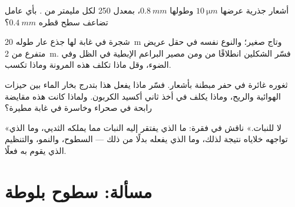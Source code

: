 \begin{exercise}[$\star\star$]\label{exo:b1:flowering-plant-organization:9}
أشعار جذرية عرضها $\qty{10}{\micro m}$ وطولها $\qty{0.8}{mm}$،
بمعدل \qty{250}{} لكل مليمتر من . بأي عامل تضاعف سطح  قطره
$\qty{0.4}{mm}$؟
\end{exercise}

\begin{exercise}[$\star\star\star$]\label{exo:b1:flowering-plant-organization:10}
شجرة في غابة لها جذع عار طوله \qty{20}{m} وتاج صغير؛ والنوع نفسه في
حقل عريض متفرع من \qty{2}{m}. فسّر الشكلين انطلاقًا من  ومن مصير البراعم الإبطية في الظل وفي الضوء، وقل ماذا تكلف
هذه المرونة وماذا تكسب.
\end{exercise}

\begin{exercise}[$\star\star\star$]\label{exo:b1:flowering-plant-organization:11}
 ثغوره غائرة في حفر مبطنة بأشعار. فسّر ماذا يفعل هذا
بتدرج بخار الماء بين حيزات  الهوائية والريح، وماذا يكلف في
أخذ ثاني أكسيد الكربون. ولماذا كانت هذه مقايضة رابحة في صحراء
وخاسرة في غابة مطيرة؟
\end{exercise}

\begin{exercise}[$\star\star\star$]\label{exo:b1:flowering-plant-organization:12}
«لا  للنبات.» ناقش في فقرة: ما الذي يفتقر إليه النبات مما
يملكه الثديي، وما الذي تواجهه خلاياه نتيجة لذلك، وما الذي يفعله بدلًا
من ذلك --- السطوح، والنمو، والتنظيم الذي يقوم به فعلًا.
\end{exercise}

\section{مسألة: سطوح بلوطة}


